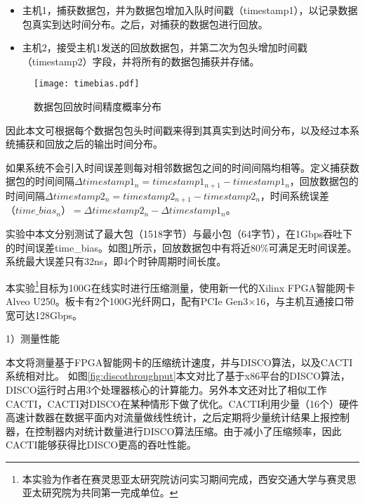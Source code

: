 \begin{itemize}
	\item 主机1，捕获数据包，并为数据包增加入队时间戳（timestamp1），以记录数据包真实到达时间分布。之后，对捕获的数据包进行回放。
	\item 主机2，接受主机1发送的回放数据包，并第二次为包头增加时间戳（timestamp2）字段，并将所有的数据包捕获并存储。
\end{itemize}

\begin{figure}[!ht]
	\centering 
	\vspace{-1.5mm} 
	\texttt{[image: timebias.pdf]}
	\caption{数据包回放时间精度概率分布} \label{fig:timebias}
\end{figure}

因此本文可根据每个数据包包头时间戳来得到其真实到达时间分布，以及经过本系统捕获和回放之后的输出时间分布。

如果系统不会引入时间误差则每对相邻数据包之间的时间间隔均相等。定义捕获数据包的时间间隔$ \Delta timestamp1_n = timestamp1_{n+1} - timestamp1_{n} $，回放数据包的时间间隔$ \Delta timestamp2_n = timestamp2_{n+1} - timestamp2_{n} $，时间系统误差$ （time\_bias_n）=\Delta timestamp2_n - \Delta timestamp1_n $。



实验中本文分别测试了最大包（1518字节）与最小包（64字节），在1Gbps吞吐下的时间误差time\_bias。如图\ref{fig:timebias}所示，回放数据包中有将近80\%可满足无时间误差。系统最大误差只有32ns，即4个时钟周期时间长度。


\label{chap372}

本实验\footnote{本实验为作者在赛灵思亚太研究院访问实习期间完成，西安交通大学与赛灵思亚太研究院为共同第一完成单位。}目标为100G在线实时进行压缩测量，使用新一代的Xilinx FPGA智能网卡Alveo U250。板卡有2个100G光纤网口，配有PCIe Gen3$ \times $16，与主机互通接口带宽可达128Gbps。

1）测量性能

本文将测量基于FPGA智能网卡的压缩统计速度，并与DISCO算法，以及CACTI系统相对比。 如图\ref{fig:discothroughput}本文对比了基于x86平台的DISCO算法，DISCO运行时占用3个处理器核心的计算能力。另外本文还对比了相似工作CACTI，CACTI对DISCO在某种情形下做了优化。CACTI利用少量（16个）硬件高速计数器在数据平面内对流量做线性统计，之后定期将少量统计结果上报控制器，在控制器内对统计数量进行DISCO算法压缩。由于减小了压缩频率，因此CACTI能够获得比DISCO更高的吞吐性能。

